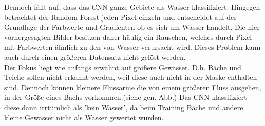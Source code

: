 Dennoch fällt auf, dass das CNN ganze Gebiete als Wasser klassifiziert.
Hingegen betrachtet der Random Forest jeden Pixel einzeln und entscheidet auf der Grundlage der Farbwerte und Gradienten ob es sich um Wasser handelt.
Die hier vorhergesagten Bilder besitzen daher häufig ein Rauschen, welches durch Pixel mit Farbwerten ähnlich zu den von Wasser verursacht wird.
Dieses Problem kann auch durch einen größeren Datensatz nicht gelöst werden.
\\
Der Fokus liegt wie anfangs erwähnt auf größere Gewässer.
D.h. Bäche und Teiche sollen nicht erkannt werden, weil diese auch nicht in der Maske enthalten sind.
Dennoch können kleinere Flussarme die von einem größeren Fluss ausgehen, in der Größe eines Bachs vorkommen.(siehe gen. Abb.)
Das CNN klassifiziert diese dann irrtümlich als 'kein Wasser', da beim Training Bäche und andere kleine Gewässer nicht als Wasser gewertet wurden.
\\
\\
